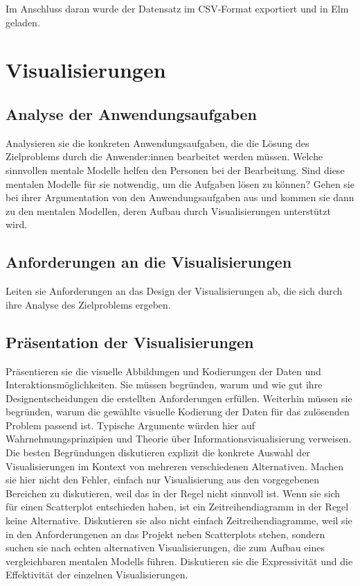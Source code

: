 \documentclass[usegeometry=true]{scrartcl}
\begin{document}
Im Anschluss daran wurde der Datensatz im CSV-Format exportiert und in Elm geladen. \\

\section{Visualisierungen}

\subsection{Analyse der Anwendungsaufgaben}

Analysieren sie die konkreten Anwendungsaufgaben, die die Lösung des Zielproblems durch die Anwender:innen bearbeitet werden müssen. 
Welche sinnvollen mentale Modelle helfen den Personen bei der Bearbeitung. 
Sind diese mentalen Modelle für sie notwendig, um die Aufgaben lösen zu können? Gehen sie bei ihrer Argumentation von den Anwendungsaufgaben aus und kommen sie dann zu den mentalen Modellen, deren Aufbau durch Visualisierungen unterstützt wird. 
\subsection{Anforderungen an die Visualisierungen}
Leiten sie Anforderungen an das Design der Visualisierungen ab, die sich durch ihre Analyse des Zielproblems ergeben.
\subsection{Präsentation der Visualisierungen}
Präsentieren sie die visuelle Abbildungen und Kodierungen der Daten und Interaktionsmöglichkeiten. 
Sie müssen  begründen, warum und wie gut ihre Designentscheidungen die erstellten Anforderungen erfüllen. 
Weiterhin müssen sie begründen, warum die gewählte visuelle Kodierung der Daten für das zulösenden Problem passend ist.
Typische Argumente würden hier auf Wahrnehmungsprinzipien und Theorie über Informationsvisualisierung verweisen. 
Die besten Begründungen diskutieren explizit die konkrete Auswahl der Visualisierungen im Kontext von mehreren verschiedenen Alternativen. 
Machen sie hier nicht den Fehler, einfach nur Visualisierung aus den vorgegebenen Bereichen zu diskutieren, weil das in der Regel nicht sinnvoll ist.
Wenn sie sich für einen Scatterplot entschieden haben, ist ein Zeitreihendiagramm in der Regel keine Alternative.
Diskutieren sie also nicht einfach Zeitreihendiagramme, weil sie in den Anforderungenen an das Projekt neben Scatterplots stehen, sondern suchen sie nach echten alternativen Visualisierungen, die zum Aufbau eines vergleichbaren mentalen Modells führen. 
Diskutieren sie die Expressivität und die Effektivität der einzelnen Visualisierungen. 
\end{document}
